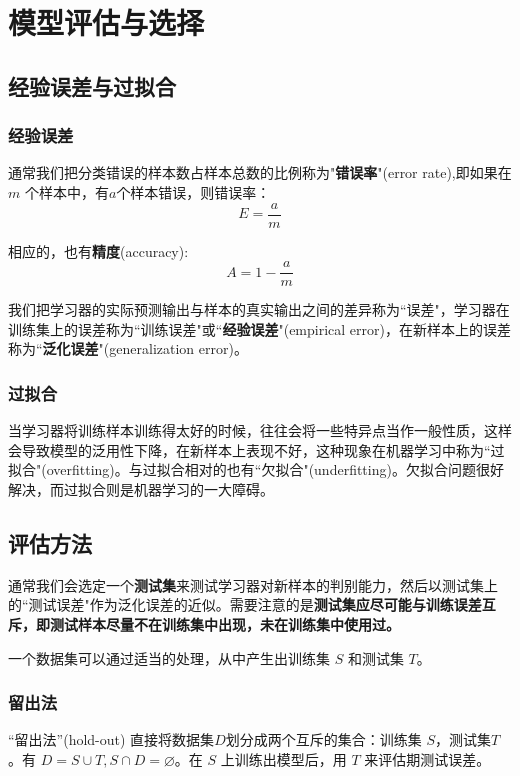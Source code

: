 \section{模型评估与选择}
\subsection{经验误差与过拟合}
\subsubsection{经验误差}

通常我们把分类错误的样本数占样本总数的比例称为"\textbf{错误率}"(error rate),即如果在 $m$ 个样本中，有$a$个样本错误，则错误率：
\[E=\frac{a}{m}\]

相应的，也有\textbf{精度}(accuracy):
\[A = 1-\frac{a}{m}\]

我们把学习器的实际预测输出与样本的真实输出之间的差异称为``误差"，学习器在训练集上的误差称为``训练误差"或``\textbf{经验误差}"(empirical error)，在新样本上的误差称为``\textbf{泛化误差}"(generalization error)。

\subsubsection{过拟合}

当学习器将训练样本训练得太好的时候，往往会将一些特异点当作一般性质，这样会导致模型的泛用性下降，在新样本上表现不好，这种现象在机器学习中称为``过拟合"(overfitting)。与过拟合相对的也有``欠拟合"(underfitting)。欠拟合问题很好解决，而过拟合则是机器学习的一大障碍。

\subsection{评估方法}

通常我们会选定一个\textbf{测试集}来测试学习器对新样本的判别能力，然后以测试集上的``测试误差"作为泛化误差的近似。需要注意的是\textbf{测试集应尽可能与训练误差互斥，即测试样本尽量不在训练集中出现，未在训练集中使用过。}

一个数据集可以通过适当的处理，从中产生出训练集 $S$ 和测试集 $T$。

\subsubsection{留出法}

``留出法''(hold-out) 直接将数据集$D$划分成两个互斥的集合：训练集 $S$，测试集$T$。有 $D = S \cup T,S\cap D = \varnothing$。在 $S$ 上训练出模型后，用 $T$ 来评估期测试误差。

